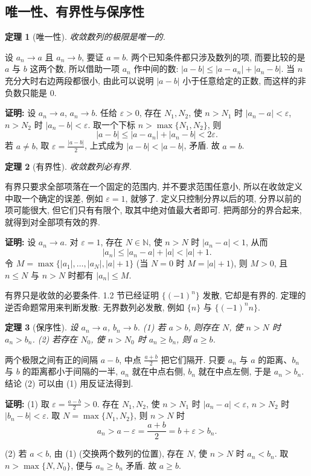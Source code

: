 \documentclass[UTF8,openany]{ctexbook}
\theoremstyle{chinesetextbook}
\newtheorem{theorem}{定理}[section]
\newenvironment{cnproof}{\par\indent\textbf{证明:} \ignorespaces}{\par}
\begin{document}
\subsection{唯一性、有界性与保序性}
\begin{theorem}[唯一性]
收敛数列的极限是唯一的.
\end{theorem}
设 $a_n\to a$ 且 $a_n\to b$, 要证 $a=b$. 两个已知条件都只涉及数列的项, 而要比较的是 $a$ 与 $b$ 这两个数, 所以借助一项 $a_n$ 作中间的数: $|a-b|\le|a-a_n|+|a_n-b|$. 当 $n$ 充分大时右边两段都很小, 由此可以说明 $|a-b|$ 小于任意给定的正数, 而这样的非负数只能是 $0$.
\begin{cnproof}
设 $a_n\to a$, $a_n\to b$. 任给 $\varepsilon>0$, 存在 $N_1,N_2$, 使 $n>N_1$ 时 $|a_n-a|<\varepsilon$, $n>N_2$ 时 $|a_n-b|<\varepsilon$. 取一个下标 $n>\max\{N_1,N_2\}$, 则
\[
|a-b|\le|a-a_n|+|a_n-b|<2\varepsilon.
\]
若 $a\ne b$, 取 $\displaystyle\varepsilon=\frac{|a-b|}2$, 上式成为 $|a-b|<|a-b|$, 矛盾. 故 $a=b$.
\end{cnproof}
\begin{theorem}[有界性]
收敛数列必有界.
\end{theorem}
有界只要求全部项落在一个固定的范围内, 并不要求范围任意小, 所以在收敛定义中取一个确定的误差, 例如 $\varepsilon=1$, 就够了. 定义只控制分界以后的项, 分界以前的项可能很大, 但它们只有有限个, 取其中绝对值最大者即可. 把两部分的界合起来, 就得到对全部项有效的界.
\begin{cnproof}
设 $a_n\to a$. 对 $\varepsilon=1$, 存在 $N\in\mathbb N$, 使 $n>N$ 时 $|a_n-a|<1$, 从而
\[
|a_n|\le|a_n-a|+|a|<|a|+1.
\]
令 $M=\max\{|a_1|,\ldots,|a_N|,|a|+1\}$ (当 $N=0$ 时 $M=|a|+1$), 则 $M>0$, 且 $n\le N$ 与 $n>N$ 时都有 $|a_n|\le M$.
\end{cnproof}
有界只是收敛的必要条件. 1.2 节已经证明 $\{(-1)^n\}$ 发散, 它却是有界的. 定理的逆否命题常用来判断发散: 无界数列必发散, 例如 $\{n\}$ 与 $\{(-1)^nn\}$.
\begin{theorem}[保序性]
设 $a_n\to a$, $b_n\to b$. \textup{(1)} 若 $a>b$, 则存在 $N$, 使 $n>N$ 时 $a_n>b_n$. \textup{(2)} 若存在 $N_0$, 使 $n>N_0$ 时 $a_n\ge b_n$, 则 $a\ge b$.
\end{theorem}
两个极限之间有正的间隔 $a-b$, 中点 $\displaystyle\frac{a+b}2$ 把它们隔开. 只要 $a_n$ 与 $a$ 的距离、$b_n$ 与 $b$ 的距离都小于间隔的一半, $a_n$ 就在中点右侧, $b_n$ 就在中点左侧, 于是 $a_n>b_n$. 结论 (2) 可以由 (1) 用反证法得到.
\begin{cnproof}
(1) 取 $\displaystyle\varepsilon=\frac{a-b}2>0$. 存在 $N_1,N_2$, 使 $n>N_1$ 时 $|a_n-a|<\varepsilon$, $n>N_2$ 时 $|b_n-b|<\varepsilon$. 取 $N=\max\{N_1,N_2\}$, 则 $n>N$ 时
\[
a_n>a-\varepsilon=\frac{a+b}2=b+\varepsilon>b_n.
\]

(2) 若 $a<b$, 由 (1) (交换两个数列的位置), 存在 $N$, 使 $n>N$ 时 $a_n<b_n$. 取 $n>\max\{N,N_0\}$, 便与 $a_n\ge b_n$ 矛盾. 故 $a\ge b$.
\end{cnproof}
\end{document}

